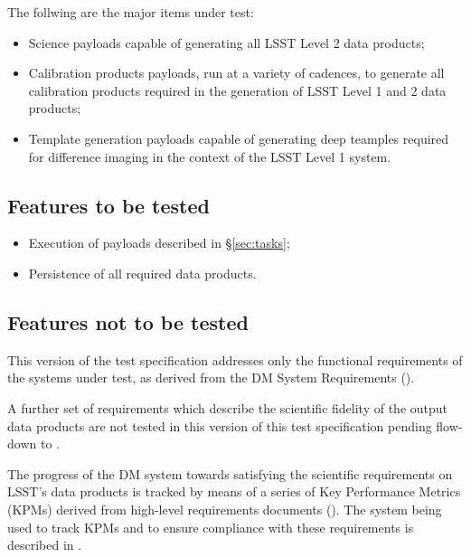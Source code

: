 \documentclass[DM,lsstdraft,STS,toc]{lsstdoc}
\begin{document}
The follwing are the major items under test:

\begin{itemize}

  \item{Science payloads capable of generating all LSST Level 2 data
  products;}

  \item{Calibration products payloads, run at a variety of cadences, to
  generate all calibration products required in the generation of LSST Level 1
  and 2 data products;}

  \item{Template generation payloads capable of generating deep teamples
  required for difference imaging in the context of the LSST Level 1 system.}

\end{itemize}

\subsection{Features to be tested}
\label{sec:feat2test}

\begin{itemize}

  \item{Execution of payloads described in \S\ref{sec:tasks};}
  \item{Persistence of all required data products.}

\end{itemize}


\subsection{Features not to be tested}
\label{sec:featnot2test}

This version of the \product test specification addresses only the functional
requirements of the systems under test, as derived from the DM System
Requirements ().

A further set of requirements which describe the scientific fidelity of the
output data products are not tested in this version of this test
specification pending flow-down to .

The progress of the DM system towards satisfying the scientific requirements
on LSST's data products is tracked by means of a series of Key Performance
Metrics (KPMs) derived from high-level requirements documents (). The system being used to track KPMs and to ensure compliance
with these requirements is described in .
\end{document}
